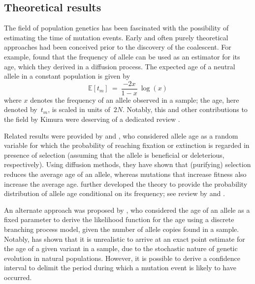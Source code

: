 %
\subsection{Theoretical results}
%

The field of population genetics has been fascinated with the possibility of estimating the time of mutation events.
Early and often purely theoretical approaches had been conceived prior to the discovery of the coalescent.
For example, \citet{Kimura:1973ug} found that the frequency of  allele can be used as an estimator for its age, which they derived in a diffusion process.
The expected age of a neutral allele in a constant population is given by
\begin{equation}\label{eq:intro_kimura_ohta}
	\mathbb{E}\left[t_m\right]~=~\frac{-2x}{1-x}~\log(x)
\end{equation}
where $x$ denotes the frequency of an allele observed in a sample; the age, here denoted by~$t_m$, is scaled in units of~$2N$.
Notably, this and other contributions to the field by Kimura were deserving of a dedicated review \citep{Watterson:1996wr}.

Related results were provided by \citet{Maruyama:1974ba} and \citet{Li:1975vj}, who considered allele age as a random variable for which the probability of reaching fixation or extinction is regarded in presence of selection (\ie assuming that the allele is beneficial or deleterious, respectively).
Using diffusion methods, they have shown that (purifying) selection reduces the average age of an allele, whereas mutations that increase fitness also increase the average age.
 further developed the theory to provide the probability distribution of allele age conditional on its frequency; see review by \citet{Slatkin:2000bi} and \citet{Slatkin:2000us}.

An alternate approach was proposed by \citet{Thompson:1976uf}, who considered the age of an allele as a fixed parameter to derive the likelihood function for the age using a discrete branching process model, given the number of allele copies found in a sample.
Notably, \citet{Thompson:1976uf} has shown that it is unrealistic to arrive at an exact point estimate for the age of a given variant in a sample, due to the stochastic nature of genetic evolution in natural populations.
However, it is possible to derive a confidence interval to delimit the period during which a mutation event is likely to have occurred.

